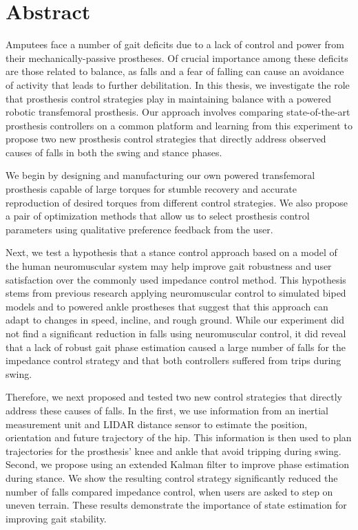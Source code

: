 \chapter*{Abstract}

Amputees face a number of gait deficits due to a lack of control and power from
their mechanically-passive prostheses. Of crucial importance among these
deficits are those related to balance, as falls and a fear of falling can cause
an avoidance of activity that leads to further debilitation. In this thesis, we
investigate the role that prosthesis control strategies play in maintaining
balance with a powered robotic transfemoral prosthesis. Our approach involves
comparing state-of-the-art prosthesis controllers on a common platform and
learning from this experiment to propose two new prosthesis control strategies
that directly address observed causes of falls in both the swing and stance
phases.

We begin by designing and manufacturing our own powered transfemoral prosthesis
capable of large torques for stumble recovery and accurate reproduction of
desired torques from different control strategies. We also propose a pair of
optimization methods that allow us to select prosthesis control parameters using
qualitative preference feedback from the user.

Next, we test a hypothesis that a stance control approach based on a model of
the human neuromuscular system may help improve gait robustness and user
satisfaction over the commonly used impedance control method. This hypothesis
stems from previous research applying neuromuscular control to simulated biped
models and to powered ankle prostheses that suggest that this approach can adapt
to changes in speed, incline, and rough ground. While our experiment did not
find a significant reduction in falls using neuromuscular control, it did reveal
that a lack of robust gait phase estimation caused a large number of falls for
the impedance control strategy and that both controllers suffered from trips
during swing.

Therefore, we next proposed and tested two new control strategies that directly
address these causes of falls. In the first, we use information from an inertial
measurement unit and LIDAR distance sensor to estimate the position, orientation
and future trajectory of the hip. This information is then used to plan
trajectories for the prosthesis' knee and ankle that avoid tripping during
swing. Second, we propose using an extended Kalman filter to improve phase
estimation during stance. We show the resulting control strategy significantly
reduced the number of falls compared impedance control, when users are asked to
step on uneven terrain. These results demonstrate the importance of state
estimation for improving gait stability.
